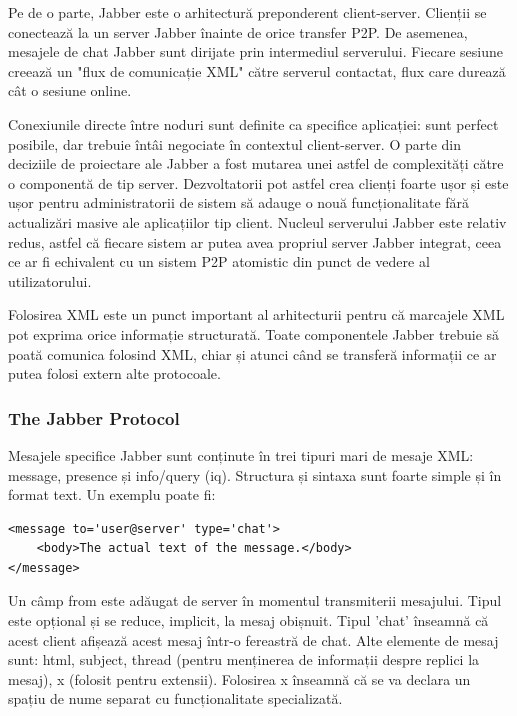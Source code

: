 Pe de o parte, Jabber este o arhitectură preponderent client-server. Clienții
se conectează la un server Jabber înainte de orice transfer P2P. De asemenea,
mesajele de chat Jabber sunt dirijate prin intermediul serverului. Fiecare
sesiune creează un "flux de comunicație XML" către serverul contactat, flux
care durează cât o sesiune online.

Conexiunile directe între noduri sunt definite ca specifice aplicației: sunt
perfect posibile, dar trebuie întâi negociate în contextul client-server. O
parte din deciziile de proiectare ale Jabber a fost mutarea unei astfel de
complexități către o componentă de tip server. Dezvoltatorii pot astfel crea
clienți foarte ușor și este ușor pentru administratorii de sistem să adauge o
nouă funcționalitate fără actualizări masive ale aplicațiilor tip client.
Nucleul serverului Jabber este relativ redus, astfel că fiecare sistem ar
putea avea propriul server Jabber integrat, ceea ce ar fi echivalent cu un
sistem P2P atomistic din punct de vedere al utilizatorului.

Folosirea XML este un punct important al arhitecturii pentru că marcajele XML
pot exprima orice informație structurată. Toate componentele Jabber trebuie să
poată comunica folosind XML, chiar și atunci când se transferă informații ce
ar putea folosi extern alte protocoale.

\subsubsection{The Jabber Protocol}

Mesajele specifice Jabber sunt conținute în trei tipuri mari de mesaje XML:
message, presence și info/query (iq). Structura și sintaxa sunt foarte simple
și în format text. Un exemplu poate fi:

\begin{verbatim}
<message to='user@server' type='chat'>
    <body>The actual text of the message.</body>  
</message>
\end{verbatim}

Un câmp from este adăugat de server în momentul transmiterii mesajului. Tipul
este opțional și se reduce, implicit, la mesaj obișnuit. Tipul 'chat' înseamnă
că acest client afișează acest mesaj într-o fereastră de chat. Alte elemente
de mesaj sunt: html, subject, thread (pentru menținerea de informații despre
replici la mesaj), x (folosit pentru extensii). Folosirea x înseamnă că se va
declara un spațiu de nume separat cu funcționalitate specializată.

